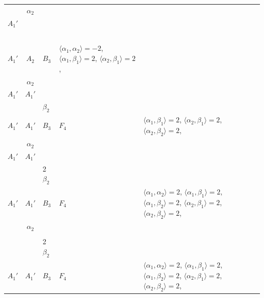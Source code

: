 \documentclass[12pt]{report}
\begin{document}
\begin{appendix}
{\begin{longtable}{rcl p{1cm}p{1cm}p{3cm} }
\\
\begin{tabular}{cc}$\alpha_1$+ & $\alpha_2$\\\tiny{ $A_1'$ } & \tiny{  }\end{tabular} &\begin{tabular}{c} = \\~ \end{tabular} & \begin{tabular}{c}$\beta_1$\\\tiny{ $A_1'$ }\end{tabular} & $A_2$ & $B_3$ & $\langle\alpha_1, \alpha_2\rangle=-2$,  $\langle\alpha_1, \beta_1\rangle=2$, $\langle\alpha_2, \beta_1\rangle=2$, 
\\
\begin{tabular}{cc}$\alpha_1$+ & $\alpha_2$\\\tiny{ $A_1'$ } & \tiny{ $A_1'$ }\end{tabular} &\begin{tabular}{c} = \\~ \end{tabular} & \begin{tabular}{cc}$\beta_1$+ & $\beta_2$\\\tiny{ $A_1'$ } & \tiny{ $A_1'$ }\end{tabular} & $B_3$ & $F_4$ &  $\langle\alpha_1, \beta_1\rangle=2$, $\langle\alpha_2, \beta_1\rangle=2$, $\langle\alpha_2, \beta_2\rangle=2$, 
\\
\begin{tabular}{cc}$\alpha_1$+ & $\alpha_2$\\\tiny{ $A_1'$ } & \tiny{ $A_1'$ }\end{tabular} &\begin{tabular}{c} = \\~ \end{tabular} & \begin{tabular}{cc}$\beta_1$+ & 2$\beta_2$\\\tiny{ $A_1'$ } & \tiny{ $A_1'$ }\end{tabular} & $B_3$ & $F_4$ & $\langle\alpha_1, \alpha_2\rangle=2$,  $\langle\alpha_1, \beta_1\rangle=2$, $\langle\alpha_1, \beta_2\rangle=2$, $\langle\alpha_2, \beta_1\rangle=2$, $\langle\alpha_2, \beta_2\rangle=2$, 
\\
\begin{tabular}{cc}$\alpha_1$+ & $\alpha_2$\\\tiny{  } & \tiny{  }\end{tabular} &\begin{tabular}{c} = \\~ \end{tabular} & \begin{tabular}{cc}$\beta_1$+ & 2$\beta_2$\\\tiny{ $A_1'$ } & \tiny{ $A_1'$ }\end{tabular} & $B_3$ & $F_4$ & $\langle\alpha_1, \alpha_2\rangle=2$,  $\langle\alpha_1, \beta_1\rangle=2$, $\langle\alpha_1, \beta_2\rangle=2$, $\langle\alpha_2, \beta_1\rangle=2$, $\langle\alpha_2, \beta_2\rangle=2$, 

\end{longtable}}
\end{appendix}
\end{document}
